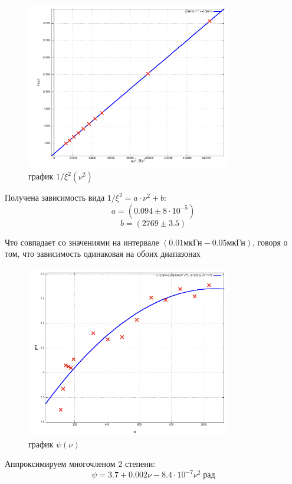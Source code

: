 \documentclass[11pt]{article}
\begin{document}
\begin{figure}[H]
    \centering
    \includegraphics[width=0.8\textwidth]{2.png}
    \caption{график \( 1/\xi^2(\nu^2) \)}
    \label{plot2}
\end{figure}

Получена зависимость вида \( 1/\xi^2 = a\cdot \nu^2 + b \):
\[ a = (0.094 \pm 8\cdot10^{-5}) \]
\[ b = (2769 \pm 3.5) \]

Что совпадает со значениями на интервале \((0.01мкГн - 0.05мкГн)\), говоря о том, 
что зависимость одинаковая на обоих диапазонах

\begin{figure}[H]
    \centering
    \includegraphics[width=0.8\textwidth]{3.png}
    \caption{график \( \psi(\nu) \)}
\end{figure}

Аппроксимируем многочленом 2 степени:
\[ \psi = 3.7 + 0.002\nu -8.4\cdot 10^{-7}\nu^2\; рад \]
\end{document}
